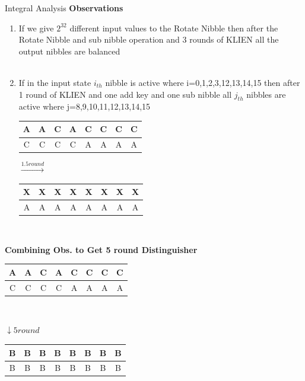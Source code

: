 \begin{frame}{Integral Analysis}
	\textbf{Observations}
	\begin{enumerate}
		
		\item If we give $2^{32}$ different input values to the Rotate Nibble then after the Rotate Nibble and sub nibble operation and 3 rounds of KLIEN all the output nibbles are balanced \\ \\
		
		\item If in the input state $i_{th}$ nibble is active where i=0,1,2,3,12,13,14,15 then after 1 round of KLIEN and one add key and one sub nibble all $j_{th}$ nibbles are active where j=8,9,10,11,12,13,14,15 \\
		\begin{tabular}{|c|c|c|c|c|c|c|c|}
			\hline
			A & A & C & A & C & C & C & C \\
			\hline
			C & C & C & C & A & A & A & A\\
			\hline
		\end{tabular}
		$\xrightarrow{1.5round}$
		\begin{tabular}{|c|c|c|c|c|c|c|c|}
			\hline
			X & X & X & X & X & X & X & X \\
			\hline
			A & A & A & A & A & A & A & A\\
			\hline
		\end{tabular}\\
	\end{enumerate}
\end{frame}
\begin{frame}
	\textbf{Combining Obs. to Get 5 round Distinguisher}\\
	\begin{tabular}{|c|c|c|c|c|c|c|c|}
		\hline
		A & A & C & A & C & C & C & C \\
		\hline
		C & C & C & C & A & A & A & A\\
		\hline
	\end{tabular}\\
	\begin{center}$\downarrow 5 round$\\ \end{center}
	\begin{tabular}{|c|c|c|c|c|c|c|c|}
		\hline
		B & B & B & B & B & B & B & B \\
		\hline
		B & B & B & B & B & B & B & B\\
		\hline
	\end{tabular}
\end{frame}

